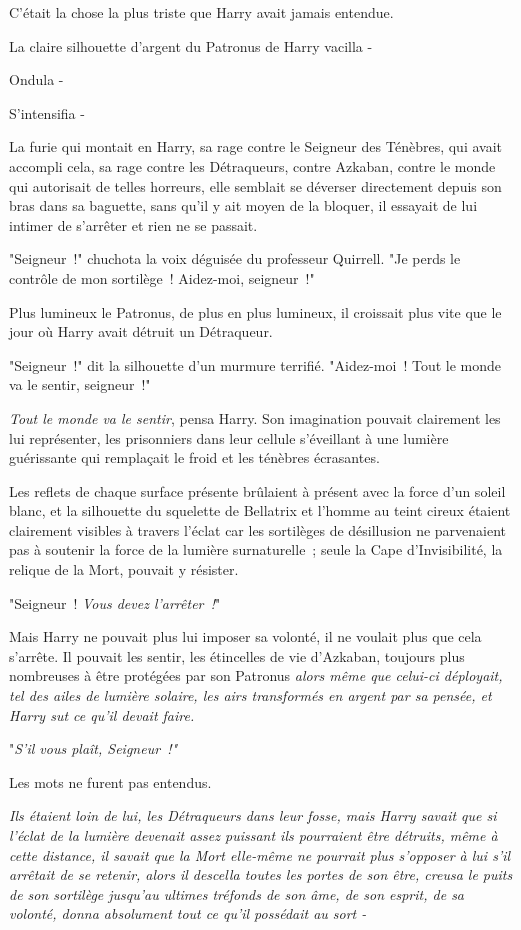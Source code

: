 C'était la chose la plus triste que Harry avait jamais entendue.

La claire silhouette d'argent du Patronus de Harry vacilla -

Ondula -

S'intensifia -

La furie qui montait en Harry, sa rage contre le Seigneur des Ténèbres, qui avait accompli cela, sa rage contre les Détraqueurs, contre Azkaban, contre le monde qui autorisait de telles horreurs, elle semblait se déverser directement depuis son bras dans sa baguette, sans qu'il y ait moyen de la bloquer, il essayait de lui intimer de s'arrêter et rien ne se passait.

"Seigneur~!" chuchota la voix déguisée du professeur Quirrell. "Je perds le contrôle de mon sortilège~! Aidez-moi, seigneur~!"

Plus lumineux le Patronus, de plus en plus lumineux, il croissait plus vite que le jour où Harry avait détruit un Détraqueur.

"Seigneur~!" dit la silhouette d'un murmure terrifié. "Aidez-moi~! Tout le monde va le sentir, seigneur~!"

\emph{Tout le monde va le sentir}, pensa Harry. Son imagination pouvait clairement les lui représenter, les prisonniers dans leur cellule s'éveillant à une lumière guérissante qui remplaçait le froid et les ténèbres écrasantes.

Les reflets de chaque surface présente brûlaient à présent avec la force d'un soleil blanc, et la silhouette du squelette de Bellatrix et l'homme au teint cireux étaient clairement visibles à travers l'éclat car les sortilèges de désillusion ne parvenaient pas à soutenir la force de la lumière surnaturelle~; seule la Cape d'Invisibilité, la relique de la Mort, pouvait y résister.

"Seigneur~! \emph{Vous devez l'arrêter~!}"

Mais Harry ne pouvait plus lui imposer sa volonté, il ne voulait plus que cela s'arrête. Il pouvait les sentir, les étincelles de vie d'Azkaban, toujours plus nombreuses à être protégées par son Patronus \emph{alors même que celui-ci déployait, tel des ailes de lumière solaire, les airs transformés en argent par sa pensée, et Harry sut ce qu'il devait faire.}

"\emph{S'il vous plaît, Seigneur~!"}

Les mots ne furent pas entendus.

\emph{Ils étaient loin de lui, les Détraqueurs dans leur fosse, mais Harry savait que si l'éclat de la lumière devenait assez puissant ils pourraient être détruits, même à cette distance, il savait que la Mort elle-même ne pourrait plus s'opposer à lui s'il arrêtait de se retenir, alors il descella toutes les portes de son être, creusa le puits de son sortilège jusqu'au ultimes tréfonds de son âme, de son esprit, de sa volonté, donna absolument tout ce qu'il possédait au sort -}

